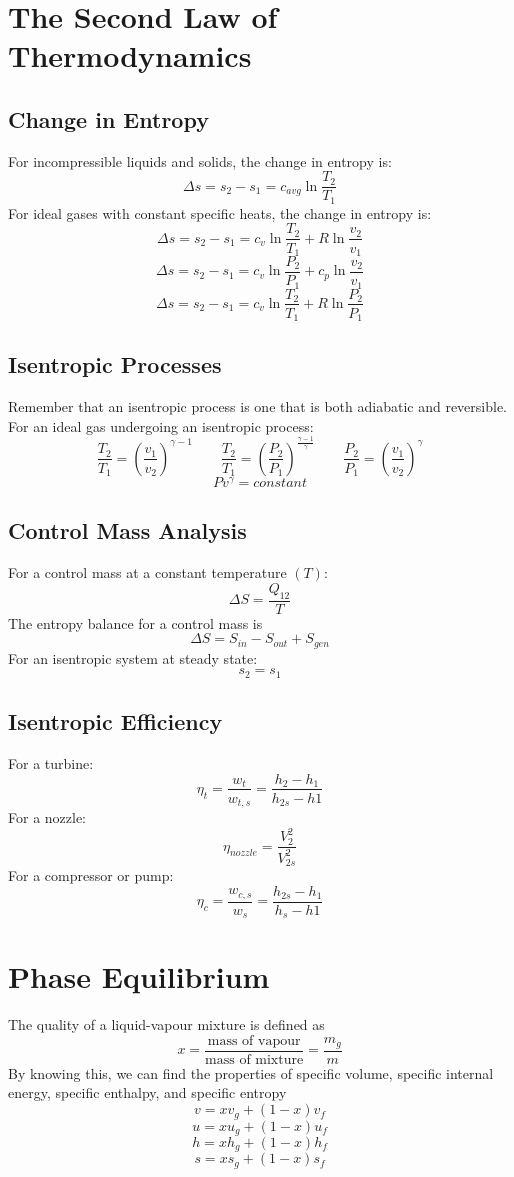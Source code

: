 \documentclass[11pt]{article}
\begin{document}
\section{The Second Law of Thermodynamics}
\subsection{Change in Entropy}
For incompressible liquids and solids, the change in entropy is:
$$ \Delta s = s_2 - s_1 = c_{avg} \ln \frac{T_2}{T_1} $$
For ideal gases with constant specific heats, the change in entropy is:
$$ \Delta s = s_2 - s_1 = c_v \ln \frac{T_2}{T_1} + R\ln \frac{v_2}{v_1} $$
$$ \Delta s = s_2 - s_1 = c_v \ln \frac{P_2}{P_1} + c_p \ln \frac{v_2}{v_1} $$
$$  \Delta s = s_2 - s_1 = c_v \ln \frac{T_2}{T_1} + R\ln \frac{P_2}{P_1} $$
\subsection{Isentropic Processes}
Remember that an isentropic process is one that is both adiabatic and reversible. For an ideal gas undergoing an isentropic process:
$$ \frac{T_2}{T_1} = \left(\frac{v_1}{v_2}\right)^{\gamma - 1} \quad \quad \frac{T_2}{T_1} = \left(\frac{P_2}{P_1}\right)^{\frac{\gamma - 1}{\gamma}} \quad \quad \frac{P_2}{P_1} = \left(\frac{v_1}{v_2}\right)^{\gamma}$$
\smallskip
$$ Pv^\gamma = constant$$
\subsection{Control Mass Analysis}
For a control mass at a constant temperature $(T)$:
$$ \Delta S = \frac{Q_{12}}{T}$$
The entropy balance for a control mass is 
$$ \Delta S = S_{in} - S_{out} + S_{gen} $$
For an isentropic system at steady state:
$$ s_2 = s_1$$
\subsection{Isentropic Efficiency}
For a turbine:
$$ \eta_t = \frac{w_t}{w_{t,s}} = \frac{h_2 - h_1}{h_{2s} - h1}$$
For a nozzle:
$$ \eta_{nozzle} = \frac{V_2^2}{V_{2s}^2}$$
For a compressor or pump:
$$ \eta_c = \frac{w_{c,s}}{w_{s}} = \frac{h_{2s} - h_1}{h_s - h1}$$
\pagebreak
\section{Phase Equilibrium}
The quality of a liquid-vapour mixture is defined as
$$ x = \frac{\text{mass of vapour}}{\text{mass of mixture}} = \frac{m_g}{m} $$
By knowing this, we can find the properties of specific volume, specific internal energy, specific enthalpy, and specific entropy
$$ v = xv_g + (1-x)v_f$$
$$ u = xu_g + (1-x)u_f$$
$$ h = xh_g + (1-x)h_f$$
$$ s = xs_g + (1-x)s_f$$
\end{document}

